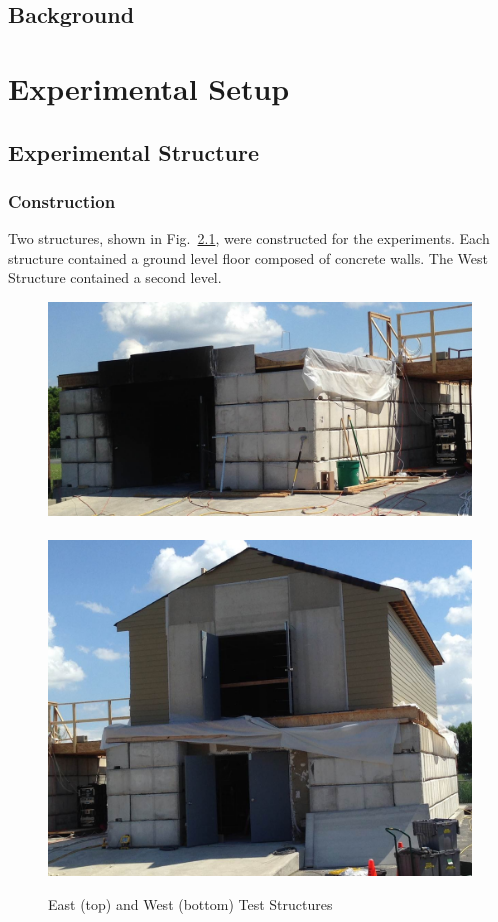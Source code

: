 \documentclass[12pt,oneside]{book}
\begin{document}
\section{Background}
\label{sec:Background}


\chapter{Experimental Setup}
\label{chap:Experimental_Setup}

\section{Experimental Structure}
\label{sec:Experimental_Structure}

\subsection{Construction}
\label{sec:Construction}
Two structures, shown in Fig.~\ref{fig:struct_pics}, were constructed for the experiments. Each structure contained a ground level floor composed of concrete walls. The West Structure contained a second level.

\begin{figure}[!ht]
\includegraphics[width=6in]{../../Figures/east_structure}
\\~\\
\includegraphics[width=6in]{../../Figures/west_structure}
\caption[East and West Test Structures]{East (top) and West (bottom) Test Structures}
\label{fig:struct_pics}
\end{figure}
\end{document}
